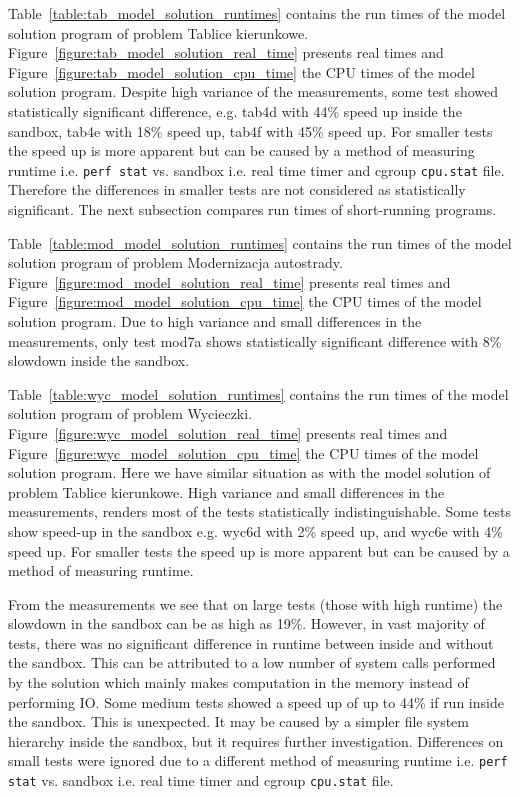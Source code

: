 \documentclass[en]{pracamgr}
\begin{document}
Table~\ref{table:tab_model_solution_runtimes} contains the run times of the model solution program of problem Tablice kierunkowe. Figure~\ref{figure:tab_model_solution_real_time} presents real times and Figure~\ref{figure:tab_model_solution_cpu_time} the CPU times of the model solution program. Despite high variance of the measurements, some test showed statistically significant difference, e.g. tab4d with 44\% speed up inside the sandbox, tab4e with 18\% speed up, tab4f with 45\% speed up. For smaller tests the speed up is more apparent but can be caused by a method of measuring runtime i.e. \texttt{perf stat} vs. sandbox i.e. real time timer and cgroup \texttt{cpu.stat} file. Therefore the differences in smaller tests are not considered as statistically significant. The next subsection compares run times of short-running programs.

Table~\ref{table:mod_model_solution_runtimes} contains the run times of the model solution program of problem Modernizacja autostrady. Figure~\ref{figure:mod_model_solution_real_time} presents real times and Figure~\ref{figure:mod_model_solution_cpu_time} the CPU times of the model solution program. Due to high variance and small differences in the measurements, only test mod7a shows statistically significant difference with 8\% slowdown inside the sandbox.

Table~\ref{table:wyc_model_solution_runtimes} contains the run times of the model solution program of problem Wycieczki. Figure~\ref{figure:wyc_model_solution_real_time} presents real times and Figure~\ref{figure:wyc_model_solution_cpu_time} the CPU times of the model solution program. Here we have similar situation as with the model solution of problem Tablice kierunkowe. High variance and small differences in the measurements, renders most of the tests statistically indistinguishable. Some tests show speed-up in the sandbox e.g. wyc6d with 2\% speed up, and wyc6e with 4\% speed up. For smaller tests the speed up is more apparent but can be caused by a method of measuring runtime.

From the measurements we see that on large tests (those with high runtime) the slowdown in the sandbox can be as high as 19\%. However, in vast majority of tests, there was no significant difference in runtime between inside and without the sandbox. This can be attributed to a low number of system calls performed by the solution which mainly makes computation in the memory instead of performing IO. Some medium tests showed a speed up of up to 44\% if run inside the sandbox. This is unexpected. It may be caused by a simpler file system hierarchy inside the sandbox, but it requires further investigation. Differences on small tests were ignored due to a different method of measuring runtime i.e. \texttt{perf stat} vs. sandbox i.e. real time timer and cgroup \texttt{cpu.stat} file.
\end{document}
